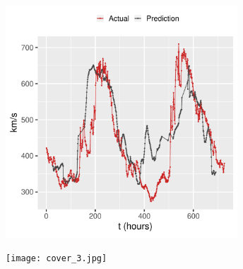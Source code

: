 \documentclass[a4paper]{article}            %
\begin{document}
\begin{slidetop}
    \begin{center}
        \includegraphics[width=0.65\textwidth]{test_2016-11-16_2016-12-17_ts.pdf}%
    \end{center}
    
\end{slidetop}



\begin{slidetop}
    \begin{center}
        \texttt{[image: cover\_3.jpg]}%
    \end{center}
    
\end{slidetop}


\end{document}
